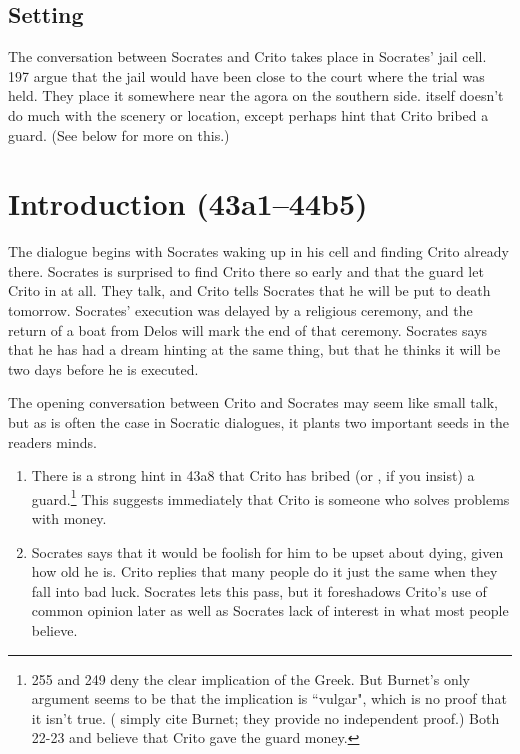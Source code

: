 \documentclass[11pt]{article}
\begin{document}
\subsection{Setting}

The conversation between Socrates and Crito takes place in Socrates' jail cell.  \citet{brickhouse2004} 197 argue that the jail would have been close to the court where the trial was held.  They place it somewhere near the agora on the southern side.   itself doesn't do much with the scenery or location, except perhaps hint that Crito bribed a guard.  (See below for more on this.)

\section{Introduction (43a1--44b5)}

The dialogue begins with Socrates waking up in his cell and finding Crito already there.  Socrates is surprised to find Crito there so early and that the guard let Crito in at all.  They talk, and Crito tells Socrates that he will be put to death tomorrow.  Socrates' execution was delayed by a religious ceremony, and the return of a boat from Delos will mark the end of that ceremony.  Socrates says that he has had a dream hinting at the same thing, but that he thinks it will be two days before he is executed.

The opening conversation between Crito and Socrates may seem like small talk, but as is often the case in Socratic dialogues, it plants two important seeds in the readers minds.

\begin{enumerate}
    \item There is a strong hint in 43a8 that Crito has bribed (or , if you insist) a guard.\footnote{\citet{burnet1924} 255 and \citet{brickhouse2004} 249 deny the clear implication of the Greek.  But Burnet's only argument seems to be that the implication is ``vulgar", which is no proof that it isn't true.  (\citet{brickhouse2004} simply cite Burnet; they provide no independent proof.)  Both \citet{adam1988} 22-23 and \citet{rose1983} believe that Crito gave the guard money.}  This suggests immediately that Crito is someone who solves problems with money.
    \item Socrates says that it would be foolish for him to be upset about dying, given how old he is.  Crito replies that many people do it just the same when they fall into bad luck.  Socrates lets this pass, but it foreshadows Crito's use of common opinion later as well as Socrates lack of interest in what most people believe.
\end{enumerate}
\end{document}
